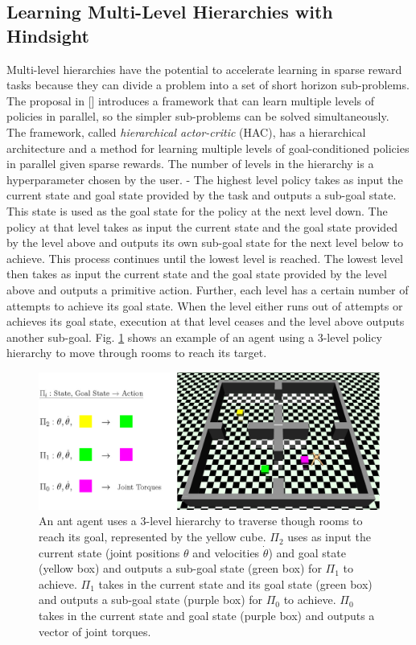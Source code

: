 \documentclass[conference]{IEEEtran}
\begin{document}
\subsection{Learning Multi-Level Hierarchies with Hindsight}
Multi-level hierarchies have the potential to accelerate learning in sparse reward tasks because they can divide a problem into a set of short horizon sub-problems. The proposal in [\cite{levy2019learning}] introduces a framework that can learn multiple levels of policies in parallel, so the simpler sub-problems can be solved simultaneously. The framework, called \textit{hierarchical actor-critic} (HAC), has a hierarchical architecture and a method for learning multiple levels of goal-conditioned policies in parallel given sparse rewards. The number of levels in the hierarchy is a hyperparameter chosen by the user.
-
The highest level policy takes as input the current state and goal state provided by the task and outputs a sub-goal state. This state is used as the goal state for the policy at the next level down. The policy at that level takes as input the current state and the goal state provided by the level above and outputs its own sub-goal state for the next level below to achieve. This process continues until the lowest level is reached. The lowest level then takes as input the current state and the goal state provided by the level above and outputs a primitive action. Further, each level has a certain number of attempts to achieve its goal state. When the level either runs out of attempts or achieves its goal state, execution at that level ceases and the level above outputs another sub-goal. Fig. \ref{fig:mutilevel_her_example} shows an example of an agent using a 3-level policy hierarchy to move through rooms to reach its target.
\begin{figure}[ht]
\centering
\includegraphics[width=0.9\columnwidth]{img/MultiLevelHER_example.png}
\caption{An ant agent uses a 3-level hierarchy to traverse though rooms to reach its goal, represented by the yellow cube. $\Pi_2$ uses as input the current state (joint positions $\theta$ and velocities $\dot{\theta}$) and goal state (yellow box) and outputs a sub-goal state (green box) for $\Pi_1$ to achieve. $\Pi_1$ takes in the current state and its goal state (green box) and outputs a sub-goal state (purple box) for $\Pi_0$ to achieve. $\Pi_0$ takes in the current state and goal state (purple box) and outputs a vector of joint torques.}
\label{fig:mutilevel_her_example}
\end{figure}
\end{document}
